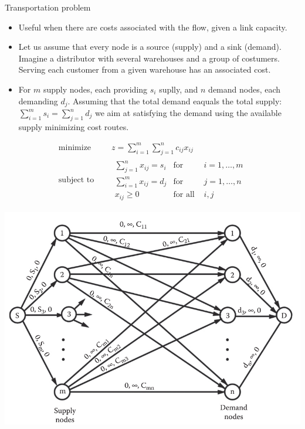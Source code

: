 \documentclass[c]{beamer}
\begin{document}
\begin{frame}{Transportation problem}
\begin{itemize}
 
  \item Useful when there are costs associated with the flow, given a link capacity. 
  
  \item Let us assume that every node is a source (supply) and a sink (demand). Imagine a distributor with several warehouses and a group of costumers. Serving each customer from a given warehouse has an associated cost.
  
  \item For $m$ supply nodes, each providing $s_i$ suplly,  and $n$ demand nodes, each demanding $d_j$. Assuming that the total demand eaquals the total supply: $\sum_{i=1}^m s_i = \sum_{j=1}^n d_j$ we aim at satisfying the demand using the available supply minimizing cost routes.

\end{itemize}
\end{frame}

\begin{frame}
  \begin{equation*}
    \begin{aligned}
      \text{minimize } \quad & z = \sum_{i=1}^m \sum_{j=1}^n c_{ij}x_{ij} \\
      \text{subject to }\quad &
      \begin{array}{rcl}
        \sum_{j=1}^n x_{ij}= s_i&\text{for }& i=1,\ldots,m \\
        \sum_{i=1}^m x_{ij} = d_j &\text{for }& j=1,\ldots,n \\
        x_{ij} \geq 0 & \text{for all } & i,j
      \end{array}
    \end{aligned}
  \end{equation*}
  \begin{center}
    \includegraphics[width=0.6\linewidth]{../figures/transportationproblem.png}
  \end{center}
\end{frame}
\end{document}
